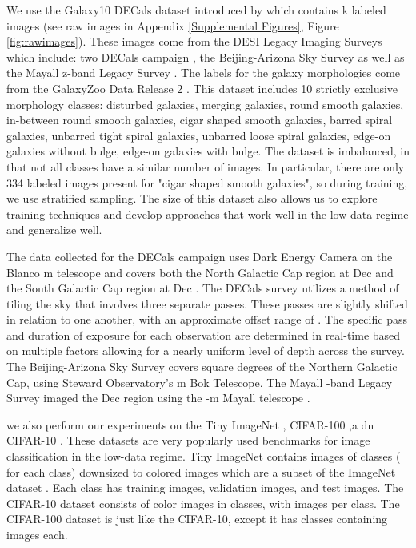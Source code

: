 \documentclass{article} \usepackage{iclr2023_conference,times}
\begin{document}
We use the Galaxy10 DECals dataset introduced by \cite{2019MNRAS.483.3255L} which contains k labeled images (see raw images in Appendix \ref{Supplemental Figures}, Figure \ref{fig:rawimages}). These images come from the DESI Legacy Imaging Surveys which include: two DECals campaign \citep{dey2019overview, 2022MNRAS}, the Beijing-Arizona Sky Survey \citep{Zou_2019} as well as the Mayall z-band Legacy Survey \citep{dey2019overview}. The labels for the galaxy morphologies come from the GalaxyZoo Data Release 2 \citep{2008MNRAS, 2011MNRAS}. This dataset includes 10 strictly exclusive morphology classes: disturbed galaxies, merging galaxies, round smooth galaxies, in-between round smooth galaxies, cigar shaped smooth galaxies, barred spiral galaxies, unbarred tight spiral galaxies, unbarred loose spiral galaxies, edge-on galaxies without bulge, edge-on galaxies with bulge. The dataset is imbalanced, in that not all classes have a similar number of images. In particular, there are only 334 labeled images present for "cigar shaped smooth galaxies", so during training, we use stratified sampling. The size of this dataset also allows us to explore training techniques and develop approaches that work well in the low-data regime and generalize well.

The data collected for the DECals campaign uses Dark Energy Camera \cite{Flaugher_2015} on the Blanco m telescope and covers both the North Galactic Cap region at Dec  and the South Galactic Cap region at Dec . The DECals survey utilizes a method of tiling the sky that involves three separate passes. These passes are slightly shifted in relation to one another, with an approximate offset range of . The specific pass and duration of exposure for each observation are determined in real-time based on multiple factors allowing for a nearly uniform level of depth across the survey. The Beijing-Arizona Sky Survey covers  square degrees of the Northern Galactic Cap, using Steward Observatory's m Bok Telescope. The Mayall -band Legacy Survey imaged the Dec  region using the -m Mayall telescope \citep{dey2019overview}.

we also perform our experiments on the Tiny ImageNet \citep{le2015tiny}, CIFAR-100 \citep{krizhevsky2009learning},a dn CIFAR-10 \citep{krizhevsky2009learning}. These datasets are very popularly used benchmarks for image classification in the low-data regime. Tiny ImageNet contains  images of  classes ( for each class) downsized to  colored images which are a subset of the ImageNet dataset \citep{deng2009imagenet}. Each class has  training images,  validation images, and  test images. The CIFAR-10 dataset consists of   color images in  classes, with  images per class. The CIFAR-100 dataset is just like the CIFAR-10, except it has  classes containing  images each.
\end{document}
